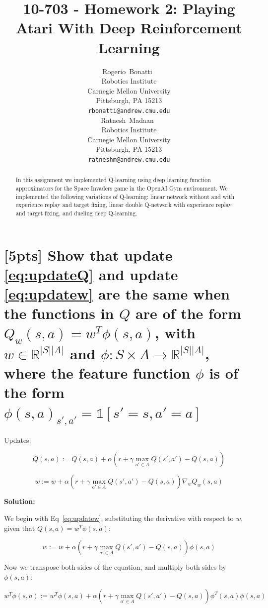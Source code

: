 \documentclass{article}
\title{10-703 - Homework 2: Playing Atari With Deep Reinforcement Learning}
\author{
  Rogerio~Bonatti\ \\
  Robotics Institute\\
  Carnegie Mellon University\\
  Pittsburgh, PA 15213 \\
  \texttt{rbonatti@andrew.cmu.edu} \\
  \And
  Ratnesh~Madaan\ \\
  Robotics Institute\\
  Carnegie Mellon University\\
  Pittsburgh, PA 15213 \\
  \texttt{ratneshm@andrew.cmu.edu} \\
}
\begin{document}

\maketitle

\begin{abstract}
  In this assignment we implemented Q-learning using deep learning function approximators for the Space Invaders game in the OpenAI Gym environment. We implemented the following variations of Q-learning: linear network without and with experience replay and target fixing, linear double Q-network with experience replay and target fixing, and dueling deep Q-learning. 
\end{abstract}

\section{[5pts] Show that update \ref{eq:updateQ} and update \ref{eq:updatew} are the same when the functions in $Q$ are of the form $Q_w(s,a) = w^T\phi(s,a)$, with $w \in \mathbb{R}^{|S||A|}$ and $\phi: S \times A \rightarrow \mathbb{R}^{|S||A|}$, where the feature function $\phi$ is of the form $\phi(s,a)_{s',a'} = \mathbb{1}[s'=s, a'=a]$}

Updates:

\begin{equation} \label{eq:updateQ}
  Q(s,a) := Q(s,a) + \alpha \left(r+\gamma \max_{a' \in A} Q(s',a') - Q(s,a)\right) 
\end{equation}

\begin{equation} \label{eq:updatew}
  w := w + \alpha \left(r+\gamma \max_{a' \in A} Q(s',a') - Q(s,a)\right) \nabla_w  Q_w(s,a)
\end{equation}

\textbf{Solution:}

We begin with Eq~\ref{eq:updatew}, substituting the derivative with respect to $w$, given that $Q(s,a)=w^T\phi(s,a)$:

\begin{equation} \label{eq:derivation_1}
  w := w + \alpha \left(r+\gamma \max_{a' \in A} Q(s',a') - Q(s,a)\right) \phi(s,a)
\end{equation}

Now we transpose both sides of the equation, and multiply both sides by $\phi(s,a)$:

\begin{equation} \label{eq:derivation_2}
  w^T\phi(s,a) := w^T\phi(s,a) + \alpha \left(r+\gamma \max_{a' \in A} Q(s',a') - Q(s,a)\right) \phi^T(s,a) \phi(s,a)
\end{equation}
\end{document}
